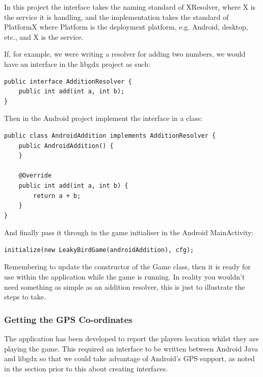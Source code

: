 In this project the interface takes the naming standard of XResolver, where X is the service it is handling, and the implementation takes the standard of PlatformX where Platform is the deployment platform, e.g. Android, desktop, etc., and X is the service.

If, for example, we were writing a resolver for adding two numbers, we would have an interface in the libgdx project as such:
\begin{verbatim}
public interface AdditionResolver {
    public int add(int a, int b);
}
\end{verbatim}
Then in the Android project implement the interface in a class:
\begin{verbatim}
public class AndroidAddition implements AdditionResolver {
    public AndroidAddition() {
    }

    @Override
    public int add(int a, int b) {
        return a + b;
    }
}
\end{verbatim}
And finally pass it through in the game initialiser in the Android MainActivity:
\begin{verbatim}
initialize(new LeakyBirdGame(androidAddition), cfg);
\end{verbatim}
Remembering to update the constructor of the Game class, then it is ready for use within the application while the game is running. In reality you wouldn’t need something as simple as an addition resolver, this is just to illustrate the steps to take.

\subsubsection{Getting the GPS Co-ordinates}
\label{getting-gps-coords}
The application has been developed to report the players location whilst they are playing the game. This required an interface to be written between Android Java and libgdx so that we could take advantage of Android's GPS support, as noted in the section prior to this about creating interfaces.

